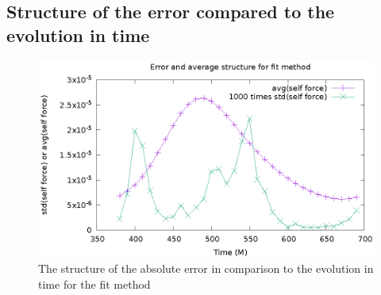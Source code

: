 \subsection{Structure of the error compared to the evolution in time}
\begin{figure}
  \includegraphics{structErrFitMethod}
  \caption{The structure of the absolute error in comparison to the evolution in time for the fit method}
\end{figure}





